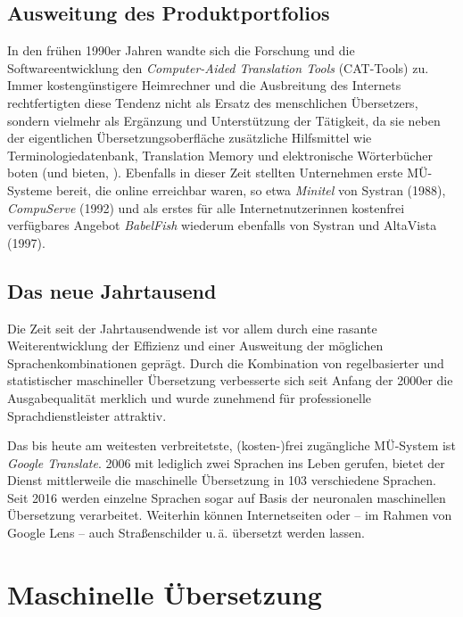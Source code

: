 \subsection{Ausweitung des Produktportfolios}
In den frühen 1990er Jahren wandte sich die Forschung und die Softwareentwicklung den \emph{Computer-Aided Translation Tools} (CAT-Tools) zu. Immer kostengünstigere Heimrechner und die Ausbreitung des Internets rechtfertigten diese Tendenz nicht als Ersatz des menschlichen Übersetzers, sondern vielmehr als Ergänzung und Unterstützung der Tätigkeit, da sie neben der eigentlichen Übersetzungsoberfläche zusätzliche Hilfsmittel wie Terminologiedatenbank, Translation Memory und elektronische Wörterbücher boten (und bieten, \citealt[38]{bowker_machine_2019}). Ebenfalls in dieser Zeit stellten Unternehmen erste MÜ-Systeme bereit, die online erreichbar waren, so etwa \emph{Minitel} von Systran (1988), \emph{CompuServe} (1992) und als erstes für alle Internetnutzer{\textperiodcentered}innen kostenfrei verfügbares Angebot \emph{BabelFish} wiederum ebenfalls von Systran und AltaVista (1997).

\subsection{Das neue Jahrtausend}
Die Zeit seit der Jahrtausendwende ist vor allem durch eine rasante Weiterentwicklung der Effizienz und einer Ausweitung der möglichen Sprachenkombinationen geprägt. Durch die Kombination von regelbasierter und statistischer maschineller Übersetzung verbesserte sich seit Anfang der 2000er die Ausgabequalität merklich und wurde zunehmend für professionelle Sprachdienstleister attraktiv.

Das bis heute am weitesten verbreitetste, (kosten-)frei zugängliche MÜ-Sys\-tem ist \emph{Google Translate}. 2006 mit lediglich zwei Sprachen ins Leben gerufen, bietet der Dienst mittlerweile die maschinelle Übersetzung in 103 verschiedene Sprachen. Seit 2016 werden einzelne Sprachen sogar auf Basis der neuronalen maschinellen Übersetzung verarbeitet. Weiterhin können Internetseiten oder -- im Rahmen von Google Lens -- auch Straßenschilder u.\,ä. übersetzt werden lassen.


\section{Maschinelle Übersetzung}

